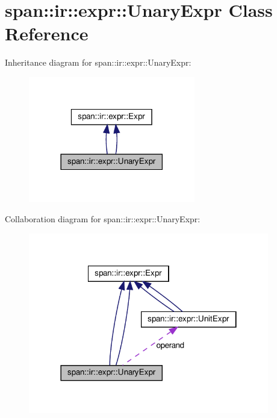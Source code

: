 \hypertarget{classspan_1_1ir_1_1expr_1_1UnaryExpr}{}\section{span\+:\+:ir\+:\+:expr\+:\+:Unary\+Expr Class Reference}
\label{classspan_1_1ir_1_1expr_1_1UnaryExpr}


Inheritance diagram for span\+:\+:ir\+:\+:expr\+:\+:Unary\+Expr\+:\nopagebreak
\begin{figure}[H]
\begin{center}
\leavevmode
\includegraphics[width=206pt]{classspan_1_1ir_1_1expr_1_1UnaryExpr__inherit__graph}
\end{center}
\end{figure}


Collaboration diagram for span\+:\+:ir\+:\+:expr\+:\+:Unary\+Expr\+:\nopagebreak
\begin{figure}[H]
\begin{center}
\leavevmode
\includegraphics[width=298pt]{classspan_1_1ir_1_1expr_1_1UnaryExpr__coll__graph}
\end{center}
\end{figure}
